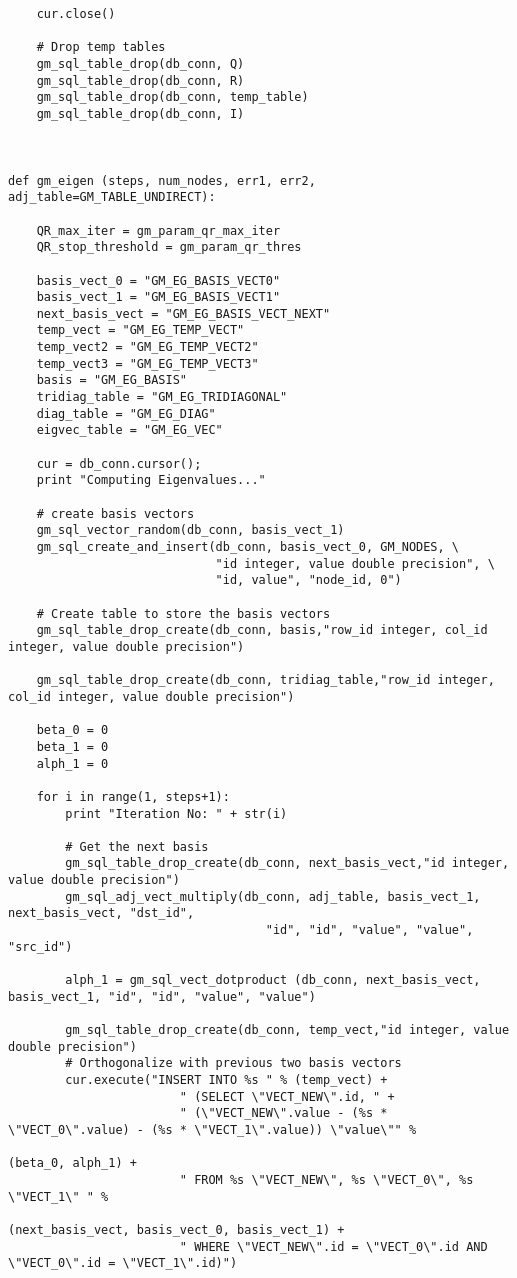 \begin{lstlisting}
    cur.close()

    # Drop temp tables
    gm_sql_table_drop(db_conn, Q)
    gm_sql_table_drop(db_conn, R)
    gm_sql_table_drop(db_conn, temp_table)
    gm_sql_table_drop(db_conn, I)



def gm_eigen (steps, num_nodes, err1, err2, adj_table=GM_TABLE_UNDIRECT):

    QR_max_iter = gm_param_qr_max_iter
    QR_stop_threshold = gm_param_qr_thres

    basis_vect_0 = "GM_EG_BASIS_VECT0"
    basis_vect_1 = "GM_EG_BASIS_VECT1"
    next_basis_vect = "GM_EG_BASIS_VECT_NEXT"
    temp_vect = "GM_EG_TEMP_VECT"
    temp_vect2 = "GM_EG_TEMP_VECT2"
    temp_vect3 = "GM_EG_TEMP_VECT3"
    basis = "GM_EG_BASIS"
    tridiag_table = "GM_EG_TRIDIAGONAL"
    diag_table = "GM_EG_DIAG"
    eigvec_table = "GM_EG_VEC"

    cur = db_conn.cursor();
    print "Computing Eigenvalues..."

    # create basis vectors
    gm_sql_vector_random(db_conn, basis_vect_1)
    gm_sql_create_and_insert(db_conn, basis_vect_0, GM_NODES, \
                             "id integer, value double precision", \
                             "id, value", "node_id, 0")

    # Create table to store the basis vectors
    gm_sql_table_drop_create(db_conn, basis,"row_id integer, col_id integer, value double precision")

    gm_sql_table_drop_create(db_conn, tridiag_table,"row_id integer, col_id integer, value double precision")

    beta_0 = 0
    beta_1 = 0
    alph_1 = 0

    for i in range(1, steps+1):
        print "Iteration No: " + str(i)

        # Get the next basis
        gm_sql_table_drop_create(db_conn, next_basis_vect,"id integer, value double precision")
        gm_sql_adj_vect_multiply(db_conn, adj_table, basis_vect_1, next_basis_vect, "dst_id",
                                    "id", "id", "value", "value", "src_id")

        alph_1 = gm_sql_vect_dotproduct (db_conn, next_basis_vect, basis_vect_1, "id", "id", "value", "value")

        gm_sql_table_drop_create(db_conn, temp_vect,"id integer, value double precision")
        # Orthogonalize with previous two basis vectors
        cur.execute("INSERT INTO %s " % (temp_vect) +
                        " (SELECT \"VECT_NEW\".id, " +
                        " (\"VECT_NEW\".value - (%s * \"VECT_0\".value) - (%s * \"VECT_1\".value)) \"value\"" %
                                                                (beta_0, alph_1) +
                        " FROM %s \"VECT_NEW\", %s \"VECT_0\", %s \"VECT_1\" " %
                                                                (next_basis_vect, basis_vect_0, basis_vect_1) +
                        " WHERE \"VECT_NEW\".id = \"VECT_0\".id AND \"VECT_0\".id = \"VECT_1\".id)")


\end{lstlisting}
